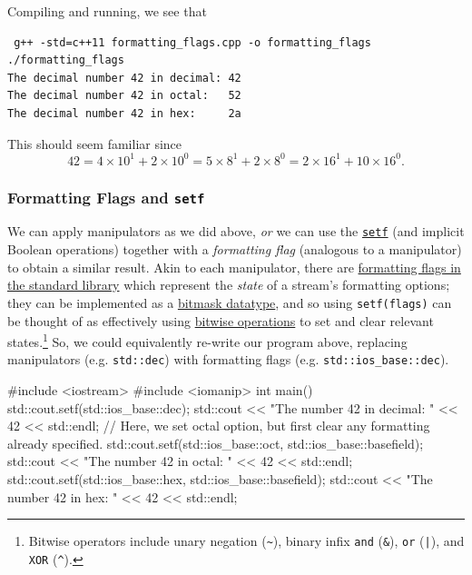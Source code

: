 \documentclass[12pt,letterpaper,twoside]{article}
\begin{document}
Compiling and running, we see that

\begin{verbatim} g++ -std=c++11 formatting_flags.cpp -o formatting_flags
./formatting_flags
The decimal number 42 in decimal: 42 
The decimal number 42 in octal:   52 
The decimal number 42 in hex:     2a \end{verbatim}
This should seem familiar since
\[
  42 = 4\times 10^1 + 2\times 10^0 = 5\times 8^1  + 2\times 8^0 = 2\times 16^1 + 10\times 16^0.
\]

\subsubsection{Formatting Flags and \texttt{setf}} 
We can apply manipulators as we did above, \emph{or} 
we can use the \href{https://en.cppreference.com/w/cpp/io/ios_base/setf}{\texttt{setf}} 
(and implicit Boolean operations) together with a \emph{formatting flag} (analogous to a manipulator)
 to obtain a similar result. 
Akin to each manipulator, there are \href{https://en.cppreference.com/w/cpp/io/ios_base/fmtflags}
{formatting flags in the standard library} which represent the \emph{state} of a stream's formatting options; they can be implemented as a 
\href{https://en.cppreference.com/w/cpp/named_req/BitmaskType}{bitmask datatype}, and so 
using \texttt{setf(flags)} can be thought of as effectively using 
\href{https://en.cppreference.com/w/cpp/language/operator_arithmetic#Bitwise_logic_operators}{bitwise operations} to 
set and clear relevant states.\footnote{Bitwise operators include unary negation (\texttt{\~}), binary infix \texttt{and} (\texttt{\&}), \texttt{or} (\texttt{|}), and 
\texttt{XOR} (\texttt{\^}).} So, we could equivalently re-write our program above, 
replacing manipulators (e.g. \texttt{std::dec})
with  formatting flags (e.g. \texttt{std::ios\_base::dec}).

\begin{cpp}
#include <iostream>
#include <iomanip>
 int main() {
    std::cout.setf(std::ios_base::dec);
    std::cout << "The number 42 in decimal: " << 42 << std::endl;
    // Here, we set octal option, but first clear any formatting already specified.
    std::cout.setf(std::ios_base::oct, std::ios_base::basefield);
    std::cout << "The number 42 in octal:   " << 42 << std::endl;
    std::cout.setf(std::ios_base::hex, std::ios_base::basefield);
    std::cout << "The number 42 in hex:     " << 42 << std::endl;
} \end{cpp}
\end{document}
